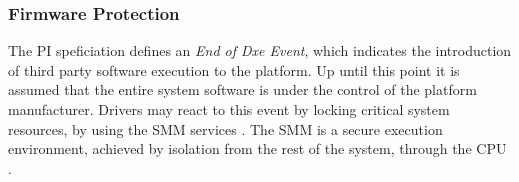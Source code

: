 \subsubsection{Firmware Protection}

The \ac{PI} speficiation defines an \emph{End of Dxe Event}, which indicates the introduction of third party software execution to the platform.
Up until this point it is assumed that the entire system software is under the control of the platform manufacturer.
Drivers may react to this event by locking critical system resources, by using the \ac{SMM} services \cite[Vol. 2, 5.1.2.1]{pi-spec}.
The \ac{SMM} is a secure execution environment, achieved by isolation from the rest of the system, through the \ac{CPU} \cite[Vol. 4, Section 1.3]{pi-spec}.





